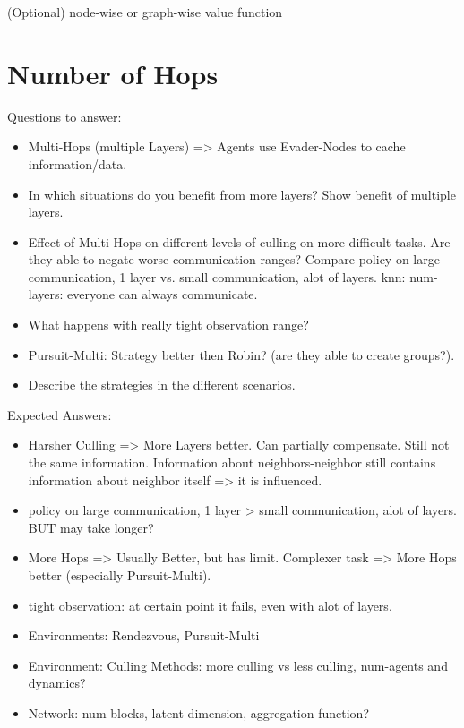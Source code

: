 (Optional) node-wise or graph-wise value function






\section{Number of Hops}
Questions to answer:
\begin{itemize}[noitemsep,nolistsep]
    \item Multi-Hops (multiple Layers) => Agents use Evader-Nodes to cache information/data.
    \item In which situations do you benefit from more layers? Show benefit of multiple layers.
    \item Effect of Multi-Hops on different levels of culling on more difficult tasks. Are they able to negate worse communication ranges? Compare policy on large communication, 1 layer vs. small communication, alot of layers. knn: num-layers: everyone can always communicate.
    \item What happens with really tight observation range?
    \item Pursuit-Multi: Strategy better then Robin? (are they able to create groups?).
    \item Describe the strategies in the different scenarios.
\end{itemize}
Expected Answers:
\begin{itemize}[noitemsep,nolistsep]
    \item Harsher Culling => More Layers better. Can partially compensate. Still not the same information. Information about neighbors-neighbor still contains information about neighbor itself => it is influenced.
    \item policy on large communication, 1 layer > small communication, alot of layers. BUT may take longer?
    \item More Hops => Usually Better, but has limit. Complexer task => More Hops better (especially Pursuit-Multi).
    \item tight observation: at certain point it fails, even with alot of layers.
\end{itemize}
\begin{itemize}[noitemsep,nolistsep]
    \item Environments: Rendezvous, Pursuit-Multi
    \item Environment: Culling Methods: more culling vs less culling, num-agents and dynamics?
    \item Network: num-blocks, latent-dimension, aggregation-function?
\end{itemize}


